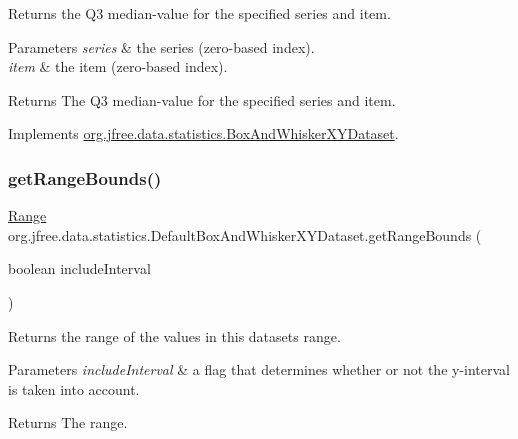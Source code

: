 Returns the Q3 median-\/value for the specified series and item.


\begin{DoxyParams}{Parameters}
{\em series} & the series (zero-\/based index). \\
\hline
{\em item} & the item (zero-\/based index).\\
\hline
\end{DoxyParams}
\begin{DoxyReturn}{Returns}
The Q3 median-\/value for the specified series and item. 
\end{DoxyReturn}


Implements \mbox{\hyperlink{interfaceorg_1_1jfree_1_1data_1_1statistics_1_1_box_and_whisker_x_y_dataset_aa0a7303f8abdc2cc56f5c4a1cdff2c49}{org.\+jfree.\+data.\+statistics.\+Box\+And\+Whisker\+X\+Y\+Dataset}}.

\mbox{\label{classorg_1_1jfree_1_1data_1_1statistics_1_1_default_box_and_whisker_x_y_dataset_ade8ae37e23cdb7c0b3cee5576785db74}} 
\subsubsection{\texorpdfstring{get\+Range\+Bounds()}{getRangeBounds()}}
{\footnotesize\ttfamily \mbox{\hyperlink{classorg_1_1jfree_1_1data_1_1_range}{Range}} org.\+jfree.\+data.\+statistics.\+Default\+Box\+And\+Whisker\+X\+Y\+Dataset.\+get\+Range\+Bounds (\begin{DoxyParamCaption}\item[{boolean}]{include\+Interval }\end{DoxyParamCaption})}

Returns the range of the values in this dataset\textquotesingle{}s range.


\begin{DoxyParams}{Parameters}
{\em include\+Interval} & a flag that determines whether or not the y-\/interval is taken into account.\\
\hline
\end{DoxyParams}
\begin{DoxyReturn}{Returns}
The range. 
\end{DoxyReturn}


